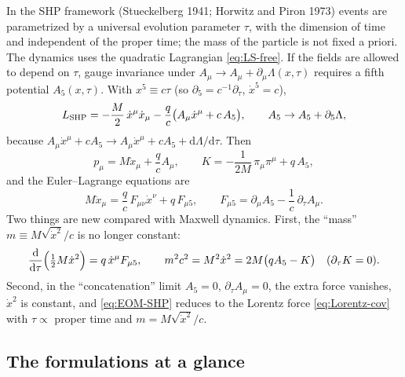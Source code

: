 \documentclass[11pt,a4paper]{book}
\numberwithin{equation}{section}
\newcommand{\dd}{\mathrm{d}}
\theoremstyle{definition}
\theoremstyle{remark}
\begin{document}
In the SHP framework (Stueckelberg 1941; Horwitz and Piron 1973) events are
parametrized by a universal evolution parameter $\tau$, with the dimension
of time and independent of the proper time; the mass of the particle is not
fixed a priori.  The dynamics uses the quadratic Lagrangian
\eqref{eq:LS-free}.  If the fields are allowed to depend on $\tau$, gauge
invariance under $A_\mu\to A_\mu+\partial_\mu\Lambda(x,\tau)$ requires a
fifth potential $A_5(x,\tau)$.  With $x^5\equiv c\tau$ (so
$\partial_5=c^{-1}\partial_\tau$, $\dot x^5=c$),
\begin{equation}
  L_{\rm SHP}=-\frac M2\,\dot x^\mu\dot x_\mu-\frac qc\bigl(A_\mu\dot x^\mu+c\,A_5\bigr),
  \qquad A_5\to A_5+\partial_5\Lambda ,
  \label{eq:L-SHP}
\end{equation}
because $A_\mu\dot x^\mu+cA_5\to A_\mu\dot x^\mu+cA_5+\dd\Lambda/\dd\tau$.  Then
\begin{equation}
  p_\mu=M\dot x_\mu+\frac qc A_\mu,\qquad
  K=-\frac1{2M}\,\pi_\mu\pi^\mu+q\,A_5,
  \label{eq:K-SHP}
\end{equation}
and the Euler--Lagrange equations are
\begin{equation}
  M\ddot x_\mu=\frac qc\,F_{\mu\nu}\dot x^\nu+q\,F_{\mu5},\qquad
  F_{\mu5}=\partial_\mu A_5-\frac1c\,\partial_\tau A_\mu .
  \label{eq:EOM-SHP}
\end{equation}
Two things are new compared with Maxwell dynamics.  First, the ``mass''
$m\equiv M\sqrt{\dot x^2}/c$ is no longer constant:
\begin{equation}
  \frac{\dd}{\dd\tau}\Bigl(\tfrac12M\dot x^2\Bigr)=q\,\dot x^\mu F_{\mu5},
  \qquad
  m^2c^2=M^2\dot x^2=2M\bigl(qA_5-K\bigr)\quad(\partial_\tau K=0).
  \label{eq:mass-SHP}
\end{equation}
Second, in the ``concatenation'' limit $A_5=0$, $\partial_\tau A_\mu=0$,
the extra force vanishes, $\dot x^2$ is constant, and
\eqref{eq:EOM-SHP} reduces to the Lorentz force \eqref{eq:Lorentz-cov} with
$\tau\propto$ proper time and $m=M\sqrt{\dot x^2}/c$.

\subsection{The formulations at a glance}
\end{document}
